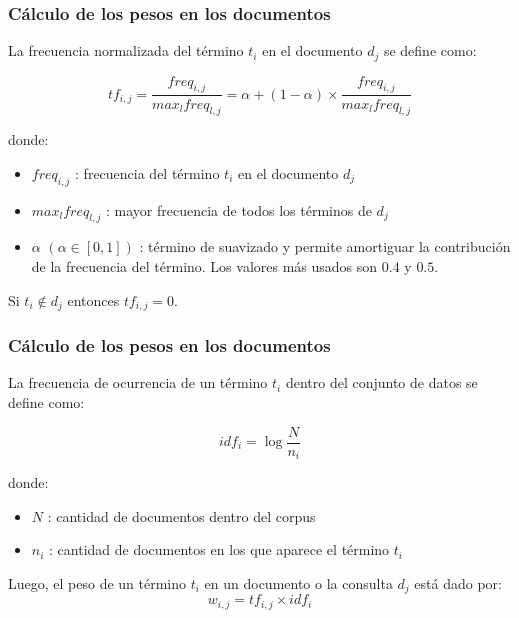 \documentclass[
10pt, %
aspectratio=169, %
]{beamer}
\begin{document}
	\begin{frame}
		
		\frametitle{Cálculo de los pesos en los documentos}
		
		La frecuencia normalizada del término $t_i$ en el documento $d_j$ se define como: 
		
		$$tf_{i, j} = \frac{freq_{i, j}}{max_l freq_{l,j}} = \alpha + (1 - \alpha) \times  \frac{freq_{i, j}}{max_l freq_{l,j}}$$ 
		
		donde:
		\begin{itemize}
			
			\item $freq_{i, j}$ : frecuencia del término $t_i$ en el documento $d_j$
			
			\item $max_l freq_{l,j}$ : mayor frecuencia de todos los términos de $d_j$
			
			\item $\alpha$ $(\alpha \in [0, 1])$ : término de suavizado y permite amortiguar la contribución de la frecuencia del término. Los valores más usados son $0.4$ y $0.5$.
			
		\end{itemize}
		
		\vspace{2\baselineskip}
		
		Si $t_i \notin d_j$ entonces $tf_{i, j} = 0$.
		
	\end{frame}
	
	\begin{frame}
		
		\frametitle{Cálculo de los pesos en los documentos}
		
		La frecuencia de ocurrencia de un término $t_i$ dentro del conjunto de datos se define como:
		
		$$idf_i = \log \frac{N}{n_i}$$
		
		donde:
		\begin{itemize}
			
			\item $N$ : cantidad de documentos dentro del corpus
			
			\item $n_i$ : cantidad de documentos en los que aparece el término $t_i$ 
			
		\end{itemize}
		
		\pause
		\vspace{2\baselineskip}
		
		Luego, el peso de un término $t_i$ en un documento o la consulta $d_j$ está dado por:
		$$w_{i, j} = tf_{i, j} \times idf_{i}$$
		
		
	\end{frame}
	
\end{document}
